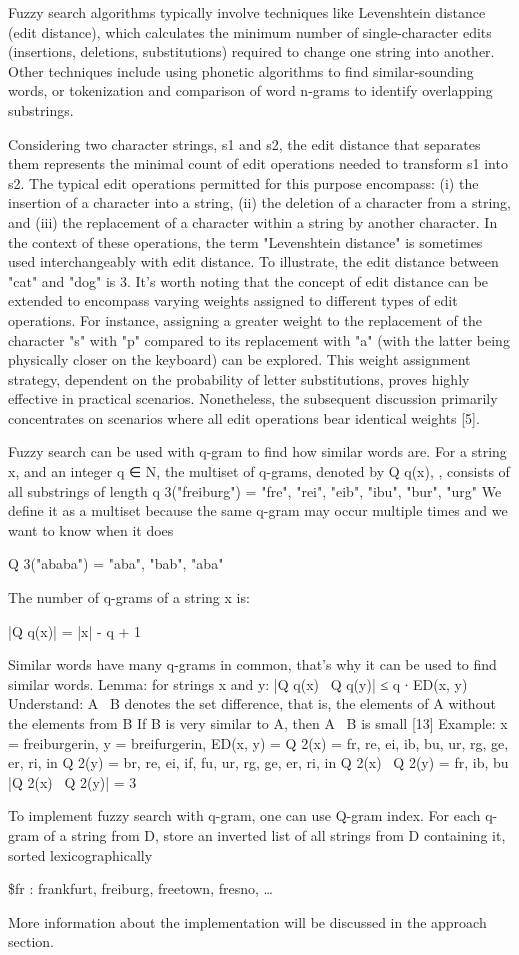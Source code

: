 Fuzzy search algorithms typically involve techniques like Levenshtein distance (edit distance), which calculates the minimum number of single-character edits (insertions, deletions, substitutions) required to change one string into another. Other techniques include using phonetic algorithms to find similar-sounding words, or tokenization and comparison of word n-grams to identify overlapping substrings.

Considering two character strings, s1 and s2, the edit distance that separates them represents the minimal count of edit operations needed to transform s1 into s2. The typical edit operations permitted for this purpose encompass: (i) the insertion of a character into a string, (ii) the deletion of a character from a string, and (iii) the replacement of a character within a string by another character. In the context of these operations, the term "Levenshtein distance" is sometimes used interchangeably with edit distance. To illustrate, the edit distance between "cat" and "dog" is 3. It's worth noting that the concept of edit distance can be extended to encompass varying weights assigned to different types of edit operations. For instance, assigning a greater weight to the replacement of the character "s" with "p" compared to its replacement with "a" (with the latter being physically closer on the keyboard) can be explored. This weight assignment strategy, dependent on the probability of letter substitutions, proves highly effective in practical scenarios. Nonetheless, the subsequent discussion primarily concentrates on scenarios where all edit operations bear identical weights [5].

Fuzzy search can be used with q-gram to find how similar words are.  For a string x, and an integer q ∈ N, the multiset of q-grams, denoted by Q q(x), , consists of all substrings of length q 3("freiburg") = { "fre", "rei", "eib", "ibu", "bur", "urg" }
We define it as a multiset because the same q-gram may occur multiple times and we want to know when it does 

Q 3("ababa") = { "aba", "bab", "aba" }

The number of q-grams of a string x is:

|Q q(x)| = |x| - q + 1

Similar words have many q-grams in common, that's why it can be used to find similar words. 
Lemma: for strings x and y: |Q q(x) \ Q q(y)| ≤ q ∙ ED(x, y)
Understand: A \ B denotes the set difference, that is, the elements of A without the elements from B If B is very similar to A, then A \ B is small [13]
Example:
x = freiburgerin, y = breifurgerin, ED(x, y) = Q 2(x) = { fr, re, ei, ib, bu, ur, rg, ge, er, ri, in } Q 2(y) = { br, re, ei, if, fu, ur, rg, ge, er, ri, in } 
Q 2(x) \ Q 2(y) = {fr, ib, bu}
|Q 2(x) \ Q 2(y)| = 3

To implement fuzzy search with q-gram, one can use Q-gram index. For each q-gram of a string from D, store an inverted list of all strings from D containing it, sorted lexicographically

\$fr : frankfurt, freiburg, freetown, fresno, …

More information about the implementation will be discussed in the approach section.
